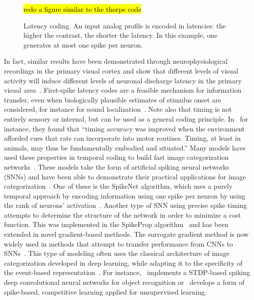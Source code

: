 \documentclass[brainsci, %
               review,submit,pdftex,moreauthors
               ]{Definitions/mdpi}
\newcommand{\note}[1]{{\sethlcolor{yellow}\hl{#1}}}
\begin{document}
\begin{figure}
\centering
\note{redo a figure similar to the thorpe code}%
\caption{Latency coding. An input analog profile is encoded in latencies: the higher the contrast, the shorter the latency. In this example, one generates at most one spike per neuron.
}\label{fig:roc}
\end{figure}
In fact, similar results have been demonstrated through neurophysiological recordings in the primary visual cortex and show that different levels of visual activity will induce different levels of neuronal discharge latency in the primary visual area~\citep{celebrini_dynamics_1993}. First-spike latency codes are a feasible mechanism for information transfer, even when biologically plausible estimates of stimulus onset are considered, for instance for sound localization~\citep{chase_first-spike_2007}.  Note also that timing is not entirely sensory or internal, but can be used as a general coding principle. In~\citep{safaie_turning_2020} for instance, they found that ``timing accuracy was improved when the environment afforded cues that rats can incorporate into motor routines. Timing, at least in animals, may thus be fundamentally embodied and situated.''  Many models have used these properties in temporal coding to build fast image categorization networks~\citep{gautrais_rate_1998,delorme_spikenet_1999, perrinet_coding_2004}. These models take the form of artificial spiking neural networks (SNNs) and have been able to demonstrate their practical applications for image categorization~\citep{delorme_ultra-rapid_2000}. One of these is the SpikeNet algorithm, which uses a purely temporal approach by encoding information using one spike per neuron by using the rank of neurons' activation~\citep{delorme_spikenet_1999,bonilla_analyzing_2022}. Another type of SNN using precise spike timing attempts to determine the structure of the network in order to minimize a cost function. This was implemented in the SpikeProp algorithm~\citep{bohte_error-backpropagation_2002} and has been extended in novel gradient-based methods. The surrogate gradient method is now widely used in methods that attempt to transfer performance from CNNs to SNNs~\citep{zenke_remarkable_2021}. This type of modeling often uses the classical architecture of image categorization developed in deep learning, while adapting it to the specificity of the event-based representation~\citep{goltz_fast_2021}. For instance,~\citep{kheradpisheh_stdp-based_2018} implements a STDP-based spiking deep convolutional neural networks for object recognition or~\citep{tavanaei_representation_2018} develops a form of spike-based, competitive learning applied for unsupervised learning. 
\end{document}
